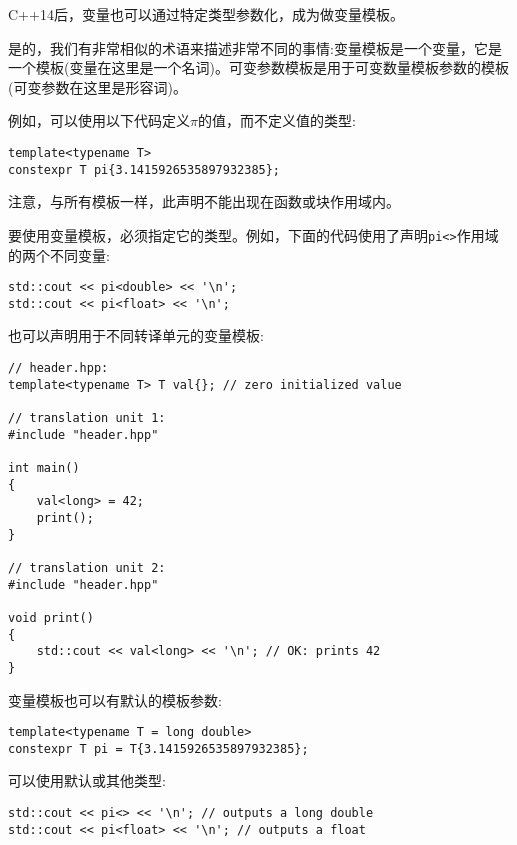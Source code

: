 C++14后，变量也可以通过特定类型参数化，成为做变量模板。

\begin{tcolorbox}[colback=webgreen!5!white,colframe=webgreen!75!black]
\hspace*{0.75cm}是的，我们有非常相似的术语来描述非常不同的事情:变量模板是一个变量，它是一个模板(变量在这里是一个名词)。可变参数模板是用于可变数量模板参数的模板(可变参数在这里是形容词)。
\end{tcolorbox}

例如，可以使用以下代码定义$\pi$的值，而不定义值的类型:

\begin{lstlisting}[style=styleCXX]
template<typename T>
constexpr T pi{3.1415926535897932385};
\end{lstlisting}

注意，与所有模板一样，此声明不能出现在函数或块作用域内。

要使用变量模板，必须指定它的类型。例如，下面的代码使用了声明\texttt{pi<>}作用域的两个不同变量:

\begin{lstlisting}[style=styleCXX]
std::cout << pi<double> << '\n';
std::cout << pi<float> << '\n';
\end{lstlisting}

也可以声明用于不同转译单元的变量模板:

\begin{lstlisting}[style=styleCXX]
// header.hpp:
template<typename T> T val{}; // zero initialized value

// translation unit 1:
#include "header.hpp"

int main()
{
	val<long> = 42;
	print();
}

// translation unit 2:
#include "header.hpp"

void print()
{
	std::cout << val<long> << '\n'; // OK: prints 42
}
\end{lstlisting}

变量模板也可以有默认的模板参数:

\begin{lstlisting}[style=styleCXX]
template<typename T = long double>
constexpr T pi = T{3.1415926535897932385};
\end{lstlisting}

可以使用默认或其他类型:

\begin{lstlisting}[style=styleCXX]
std::cout << pi<> << '\n'; // outputs a long double
std::cout << pi<float> << '\n'; // outputs a float
\end{lstlisting}

